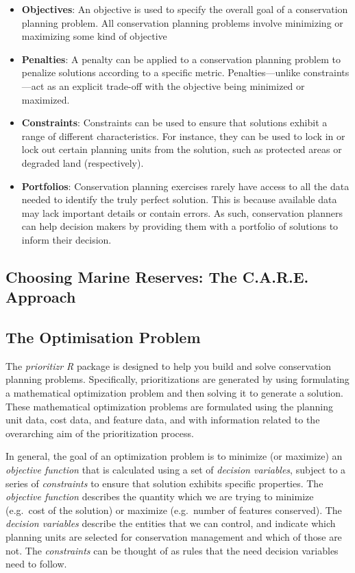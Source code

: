 \documentclass[
  12pt,
]{book}
\begin{document}
\begin{itemize}
\item
  \textbf{Objectives}: An objective is used to specify the overall goal of a conservation planning problem. All conservation planning problems involve minimizing or maximizing some kind of objective
\item
  \textbf{Penalties}: A penalty can be applied to a conservation planning problem to penalize solutions according to a specific metric. Penalties---unlike constraints---act as an explicit trade-off with the objective being minimized or maximized.
\item
  \textbf{Constraints}: Constraints can be used to ensure that solutions exhibit a range of different characteristics. For instance, they can be used to lock in or lock out certain planning units from the solution, such as protected areas or degraded land (respectively).
\item
  \textbf{Portfolios}: Conservation planning exercises rarely have access to all the data needed to identify the truly perfect solution. This is because available data may lack important details or contain errors. As such, conservation planners can help decision makers by providing them with a portfolio of solutions to inform their decision.
\end{itemize}

\hypertarget{choosing-marine-reserves-the-c.a.r.e.-approach}{%
\subsection{Choosing Marine Reserves: The C.A.R.E. Approach}\label{choosing-marine-reserves-the-c.a.r.e.-approach}}

\hypertarget{the-optimisation-problem}{%
\subsection{The Optimisation Problem}\label{the-optimisation-problem}}

The \emph{prioritizr R} package is designed to help you build and solve conservation planning problems. Specifically, prioritizations are generated by using formulating a mathematical optimization problem and then solving it to generate a solution. These mathematical optimization problems are formulated using the planning unit data, cost data, and feature data, and with information related to the overarching aim of the prioritization process.

In general, the goal of an optimization problem is to minimize (or maximize) an \emph{objective function} that is calculated using a set of \emph{decision variables}, subject to a series of \emph{constraints} to ensure that solution exhibits specific properties. The \emph{objective function} describes the quantity which we are trying to minimize (e.g.~cost of the solution) or maximize (e.g.~number of features conserved). The \emph{decision variables} describe the entities that we can control, and indicate which planning units are selected for conservation management and which of those are not. The \emph{constraints} can be thought of as rules that the need decision variables need to follow.
\end{document}
